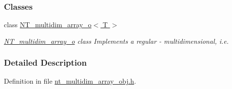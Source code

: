 \subsubsection*{Classes}
\begin{DoxyCompactItemize}
\item 
class \hyperlink{class_n_t__multidim__array__o}{NT\_\-multidim\_\-array\_\-o$<$ T $>$}
\begin{DoxyCompactList}\small\item\em \hyperlink{class_n_t__multidim__array__o}{NT\_\-multidim\_\-array\_\-o} class Implements a regular -\/ multidimensional, i.e. \item\end{DoxyCompactList}\end{DoxyCompactItemize}


\subsubsection{Detailed Description}


Definition in file \hyperlink{nt__multidim__array__obj_8h_source}{nt\_\-multidim\_\-array\_\-obj.h}.

